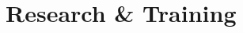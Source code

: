 \documentclass[a4paper]{twentysecondcv} %
\begin{document}
\begin{twenty}
    
    \\   


        
\end{twenty}


{\vspace{-2mm}}
\section{Research \& Training}
\end{document}

